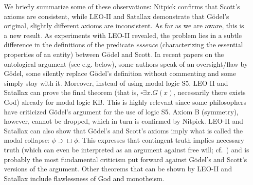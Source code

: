 \documentclass{llncs}
\begin{document}
We briefly summarize some of these observations: Nitpick confirms that
Scott's axioms are consistent, while LEO-II and Satallax demonstrate
that Gödel's original, slightly different axioms are inconsistent. As
far as we are aware, this is a new result. As experiments with LEO-II
revealed, the problem lies in a subtle difference in the definitions
of the predicate \textit{essence} (characterizing the essential
properties of an entity) between Gödel and Scott. In recent papers on
the ontological argument (see e.g. below), some authors speak of an oversight/flaw by
Gödel, some silently replace Gödel's definition without commenting and
some simply stay with it.
Moreover, instead of using modal logic S5, LEO-II and Satallax can
prove the final theorem (that is, $\square \exists x . G(x)$,
necessarily there exists God) already for modal logic KB.  This is
highly relevant since some philosophers have criticized G{\"o}del's
argument for the use of logic S5.  Axiom B (symmetry), however, cannot be dropped,
which in turn is confirmed by Nitpick.  LEO-II and Satallax can also
show that G{\"o}del's and Scott's axioms imply what is called the
modal collapse: $\phi\supset\Box\phi$. This expresses that contingent
truth implies necessary truth (which can even be interpreted as an
argument against free will; cf.~\cite{sobel2004logic}) and is probably
the most fundamental criticism put forward against G{\"o}del's and
Scott's versions of the argument. Other theorems that can be shown by
LEO-II and Satallax include flawlessness of God and 
monotheism.
\end{document}
